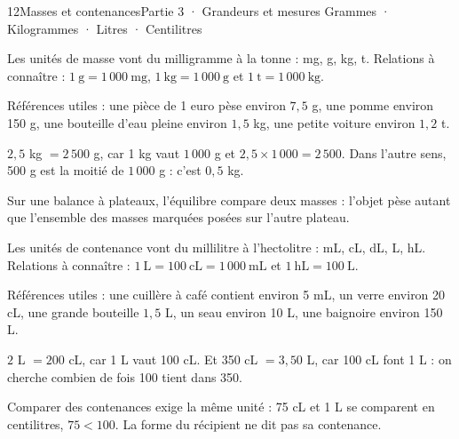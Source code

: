 \begin{ouverture}[grandeurs]{12}{Masses et contenances}{Partie 3 · Grandeurs et mesures}
{Grammes · Kilogrammes · Litres · Centilitres}
\end{ouverture}
\pagestyle{otMain}\essentiel\fontsize{11}{15}\selectfont
{}\label{cours-12-1}
\begin{definition}Les unités de masse vont du milligramme à la tonne : mg, g, kg, t. Relations à connaître : $1\ \mathrm g=1\,000\ \mathrm{mg}$, $1\ \mathrm{kg}=1\,000\ \mathrm g$ et $1\ \mathrm t=1\,000\ \mathrm{kg}$.\end{definition}
\begin{exemple}Références utiles : une pièce de 1 euro pèse environ $7{,}5$ g, une pomme environ 150 g, une bouteille d’eau pleine environ $1{,}5$ kg, une petite voiture environ $1{,}2$ t.\end{exemple}
\begin{savoirfaire}$2{,}5$ kg $=2\,500$ g, car 1 kg vaut $1\,000$ g et $2{,}5\times1\,000=2\,500$. Dans l’autre sens, 500 g est la moitié de $1\,000$ g : c’est $0{,}5$ kg.\end{savoirfaire}
\begin{attention}Sur une balance à plateaux, l’équilibre compare deux masses : l’objet pèse autant que l’ensemble des masses marquées posées sur l’autre plateau.\end{attention}
\clearpage
{}\label{cours-12-2}
\begin{definition}Les unités de contenance vont du millilitre à l’hectolitre : mL, cL, dL, L, hL. Relations à connaître : $1\ \mathrm L=100\ \mathrm{cL}=1\,000\ \mathrm{mL}$ et $1\ \mathrm{hL}=100\ \mathrm L$.\end{definition}
\begin{exemple}Références utiles : une cuillère à café contient environ 5 mL, un verre environ 20 cL, une grande bouteille $1{,}5$ L, un seau environ 10 L, une baignoire environ 150 L.\end{exemple}
\begin{savoirfaire}$2$ L $=200$ cL, car 1 L vaut 100 cL. Et 350 cL $=3{,}50$ L, car 100 cL font 1 L : on cherche combien de fois 100 tient dans 350.\end{savoirfaire}
\begin{attention}Comparer des contenances exige la même unité : 75 cL et 1 L se comparent en centilitres, $75<100$. La forme du récipient ne dit pas sa contenance.\end{attention}

